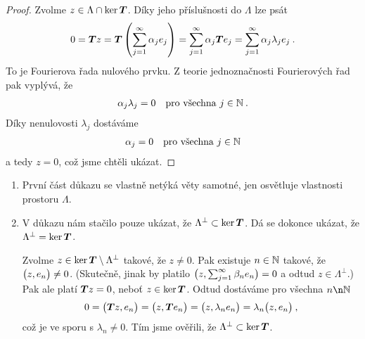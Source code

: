 \begin{proof}
Zvolme $z \in \Lambda \cap \mathrm{ker}\, \boldsymbol{T}$. Díky jeho příslušnosti do $\Lambda$ lze psát \begin{align*}
    0 = \boldsymbol{T} z = \boldsymbol{T} \left( \sum_{j=1}^\infty \alpha_j e_j \right) =  \sum_{j=1}^\infty \alpha_j \boldsymbol{T} e_j =  \sum_{j=1}^\infty \alpha_j \lambda_j e_j \:.
\end{align*}
To je Fourierova řada nulového prvku. Z teorie jednoznačnosti Fourierových řad pak vyplývá, že \begin{align*}
    \alpha_j \lambda_j =0 \quad \text{pro všechna } j \in \mathbb{N} \:.
\end{align*}
Díky nenulovosti $\lambda_j$ dostáváme \begin{align}
    \alpha_j =0 \quad \text{pro všechna } j \in \mathbb{N}
\end{align}
a tedy $z = 0$, což jsme chtěli ukázat.
\end{proof}

\begin{remark}
\begin{enumerate}
    \item První část důkazu se vlastně netýká věty samotné, jen osvětluje vlastnosti prostoru $\Lambda$.
    \item V důkazu nám stačilo pouze ukázat, že $\Lambda^\bot \subset \ker \boldsymbol{T}$. Dá se dokonce ukázat, že $\Lambda^\bot = \ker \boldsymbol{T}$.
    
    Zvolme $z \in \ker \boldsymbol{T} \setminus \Lambda^\bot $ takové, že $z \neq 0$. Pak existuje $n \in \mathbb{N}$ takové, že $\big( z, e_n \big) \neq 0$. (Skutečně, jinak by platilo $\big( z, \sum_{j=1}^\infty \beta_n e_n \big) =0 $ a odtud $z \in \Lambda^\bot$.) Pak ale platí $\boldsymbol{T} z =0$, neboť $z \in \mathrm{ker}\, \boldsymbol{T}$. Odtud dostáváme pro všechna $n \n \N$ \begin{align*}
        0 = \big( \boldsymbol{T} z, e_n \big) = \big( z, \boldsymbol{T} e_n \big) = \big( z, \lambda_n e_n \big) = \lambda_n \big( z, e_n \big) \:,
    \end{align*}
    což je ve sporu s $\lambda_n \neq 0$. Tím jsme ověřili, že $\Lambda^\bot \subset \ker \boldsymbol{T}$.
\end{enumerate}
\end{remark}

